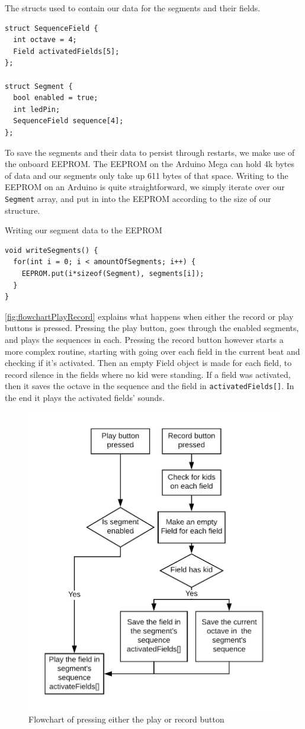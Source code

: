 		\begin{listing}[H]
			\caption{The structs used to contain our data for the segments and their fields.}
			\label{listing:structs}
			\begin{verbatim}
struct SequenceField {
  int octave = 4;
  Field activatedFields[5];
};

struct Segment {
  bool enabled = true;
  int ledPin;
  SequenceField sequence[4];
};
			\end{verbatim}
		\end{listing}
		\noindent
		To save the segments and their data to persist through restarts, we make use of the onboard EEPROM. The EEPROM on the Arduino Mega can hold 4k bytes of data and our segments only take up 611 bytes of that space. Writing to the EEPROM on an Arduino is quite straightforward, we simply iterate over our \texttt{Segment} array, and put in into the EEPROM according to the size of our structure.
		\begin{listing}[H]
			\caption{Writing our segment data to the EEPROM}
			\label{listing:writeSegment}
			\begin{verbatim}
void writeSegments() {
  for(int i = 0; i < amountOfSegments; i++) {
	EEPROM.put(i*sizeof(Segment), segments[i]);
  }
}
			\end{verbatim}
		\end{listing}
		\noindent
		\autoref{fig:flowchartPlayRecord} explains what happens when either the record or play buttons is pressed. Pressing the play button, goes through the enabled segments, and plays the sequences in each. Pressing the record button however starts a more complex routine, starting with going over each field in the current beat and checking if it's activated. Then an empty Field object is made for each field, to record silence in the fields where no kid were standing. If a field was activated, then it saves the octave in the sequence and the field in \texttt{activatedFields[]}. In the end it plays the activated fields' sounds.
		\begin{figure}[H]
			\centering
			\includegraphics[width=.5\linewidth]{figure/Implementation/flowchartPlayRecord}
			\caption{Flowchart of pressing either the play or record button}
			\label{fig:flowchartPlayRecord}
			\end{figure}
	
